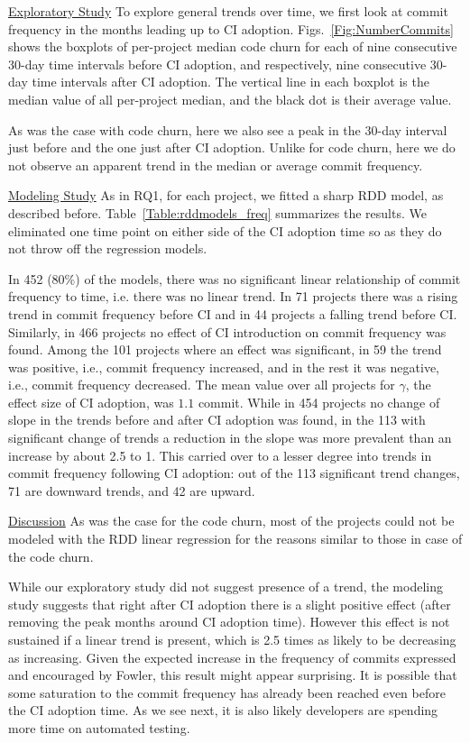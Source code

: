 \noindent \underline{Exploratory Study} To explore general trends over time, we first look at commit frequency in the months leading up to CI adoption.
Figs.~\ref{Fig:NumberCommits} shows the boxplots of per-project median code churn for each of nine consecutive 30-day time intervals before CI adoption, and respectively, nine consecutive 30-day time intervals after CI adoption.
The vertical line in each boxplot is the median value of all per-project median, and the black dot is their average value.

As was the case with code churn, here we also see a peak in the 30-day interval just before and the one just after CI adoption.
Unlike for code churn, here we do not observe an apparent trend in the median or average commit frequency.

\noindent \underline{Modeling Study} 
As in RQ1, for each project, we fitted a sharp RDD model, as described before.
Table~\ref{Table:rddmodels_freq} summarizes the results.
We eliminated one time point on either side of the CI adoption time so as they do not throw off the regression models.


In 452 (80\%) of the models, there was no significant linear relationship of commit frequency to time, i.e. there was no linear trend.
In 71 projects there was a rising trend in commit frequency before CI and in 44 projects a falling trend before CI.
Similarly, in 466 projects no effect of CI introduction on commit frequency was found. Among the 101 projects where an effect was significant, in 59 the trend was positive, i.e., commit frequency increased, and in the rest it was negative, i.e., commit frequency decreased.
The mean value over all projects for $\gamma$, the effect size of CI adoption, was $1.1$ commit.
While in 454 projects no change of slope in the trends before and after CI adoption was found, in the 113 with significant change of trends a reduction in the slope was more prevalent than an increase by about 2.5 to 1.
This carried over to a lesser degree into trends in commit frequency following CI adoption: out of the 113 significant trend changes, 71 are downward trends, and 42 are upward.

\noindent \underline{Discussion}
As was the case for the code churn, most of the projects could not be modeled with the RDD linear regression for 
the reasons similar to those in case of the code churn.

While our exploratory study did not suggest presence of a trend, the modeling study suggests that right after CI adoption there is a slight positive effect (after removing the peak months around CI adoption time). However this effect is not sustained if a linear 
trend is present, which is 2.5 times as likely to be decreasing as increasing. 
Given the expected increase in the frequency of commits expressed and encouraged by Fowler, this result might appear surprising.
It is possible that some saturation to the commit frequency has already been reached even before the CI adoption time.
As we see next, it is also likely developers are spending more time on automated testing.


